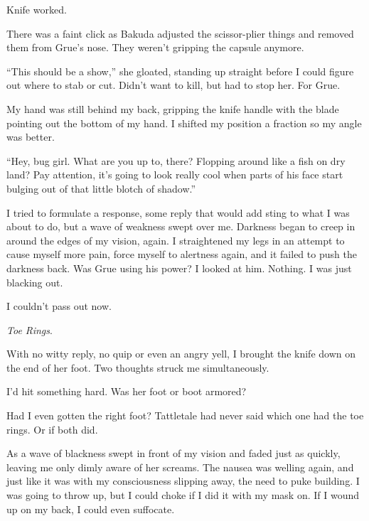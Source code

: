 Knife worked.



There was a faint click as Bakuda adjusted the scissor-plier things and removed them from Grue's nose.  They weren't gripping the capsule anymore.



``This should be a show,'' she gloated, standing up straight before I could figure out where to stab or cut.  Didn't want to kill, but had to stop her.  For Grue.



My hand was still behind my back, gripping the knife handle with the blade pointing out the bottom of my hand.  I shifted my position a fraction so my angle was better.



``Hey, bug girl.  What are you up to, there?  Flopping around like a fish on dry land?  Pay attention, it's going to look really cool when parts of his face start bulging out of that little blotch of shadow.''



I tried to formulate a response, some reply that would add sting to what I was about to do, but a wave of weakness swept over me.  Darkness began to creep in around the edges of my vision, again.  I straightened my legs in an attempt to cause myself more pain, force myself to alertness again, and it failed to push the darkness back.  Was Grue using his power?  I looked at him.  Nothing.  I was just blacking out.



I couldn't pass out now.



\emph{Toe Rings}.



With no witty reply, no quip or even an angry yell, I brought the knife down on the end of her foot.  Two thoughts struck me simultaneously.



I'd hit something hard.  Was her foot or boot armored?



Had I even gotten the right foot?  Tattletale had never said which one had the toe rings.  Or if both did.



As a wave of blackness swept in front of my vision and faded just as quickly, leaving me only dimly aware of her screams.  The nausea was welling again, and just like it was with my consciousness slipping away, the need to puke building.  I was going to throw up, but I could choke if I did it with my mask on.  If I wound up on my back, I could even suffocate.



